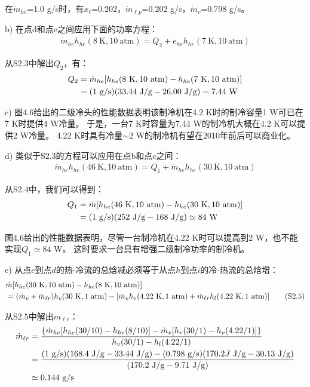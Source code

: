 在$\dot{m}_{he}$=1.0 g/s时，有$x_\ell$=0.202，$\dot{m}_{\ell p}$=0.202 g/s，$\dot{m}_{v}$=0.798 g/s。

b) 在点d和点e之间应用下面的功率方程：
\begin{align*}%
\dot{m}_{he}h_{he}(8\ \mathrm{K},10\ \mathrm{atm})=Q_2+\dot{e}_{he}h_{he}(7\ \mathrm{K},10\ \mathrm{atm}) \tag{S2.3}
\end{align*}

从S2.3中解出$Q_2$，有：
\begin{align*}%
Q_2&=\dot{m}_{he}[h_{he}(8\ \mathrm{K},10\ \mathrm{atm})-h_{he}(7\ \mathrm{K},10\ \mathrm{atm})]\\\notag
&=(1\ \mathrm{g/s})(33.44\ \mathrm{J/g}-26.00\ \mathrm{J/g})=7.44\ \mathrm{W}
\end{align*}

c) 图4.6给出的二级冷头的性能数据表明该制冷机在4.2 K时的制冷容量1 W可已在7 K时提供4 W冷量。
于是，一台7 K时容量为7.44 W的制冷机大概在4.2 K可以提供2 W冷量。
4.22 K时具有冷量$\sim 2$ W的制冷机有望在2010年前后可以商业化。

d) 类似于S2.3的方程可以应用在点b和点c之间：
\begin{align*}%
\dot{m}_{he}h_{he}(46\ \mathrm{K},10\ \mathrm{atm})=Q_1+\dot{m}_{he}h_{he}(30\ \mathrm{K},10\ \mathrm{atm}) \tag{S2.4}
\end{align*}

从S2.4中，我们可以得到：
\begin{align*}%
Q_1&=\dot{m}[h_{he}(46\ \mathrm{K},10\ \mathrm{atm})-h_{he}(30\ \mathrm{K},10\ \mathrm{atm})]\\\notag
&=(1\ \mathrm{g/s})(252\ \mathrm{J/g}-168\ \mathrm{J/g})\simeq 84\ \mathrm{W}
\end{align*}

图4.6给出的性能数据表明，尽管一台制冷机在4.22 K时可以提高到2 W，也不能实现$Q_1\simeq 84$ W。
这时要求一台具有增强二级制冷功率的制冷机。

e) 从点$c$到点$d$的热-冷流的总焓减必须等于从点$h$到点$i$的冷-热流的总焓增：
\begin{align*}%
&\dot{m}[h_{he}(30\ \mathrm{K},10\ \mathrm{atm})-h_{he}(8\ \mathrm{K},10\ \mathrm{atm})]\\\notag
&=(\dot{m}_v+\dot{m}_{\ell r})h_v(30\ \mathrm{K},1\ \mathrm{atm})-[\dot{m}_vh_v(4.22\ \mathrm{K},1\ \mathrm{atm})+\dot{m}_{\ell r}h_l(4.22\ \mathrm{K},1\ \mathrm{atm})] \tag{S2.5}
\end{align*}

从S2.5中解出$\dot{m}_{\ell r}$：
\begin{align*}%
\dot{m}_{\ell r}&=\frac{\{\dot{m}_{he}[h_{he}(30/10)-h_{he}(8/10)]-\dot{m}_v[h_v(30/1)-h_{v}(4.22/1)]\}}{h_v(30/1)-h_{l}(4.22/1)}\\\notag
&=\frac{(1\ \mathrm{g/s})(168.4\ \mathrm{J/g}-33.44\ \mathrm{J/g})-(0.798 \ \mathrm{g/s})(170.2J\ \mathrm{J/g}-30.13\ \mathrm{J/g})}{(170.2\ \mathrm{J/g}-9.71\ \mathrm{J/g})}\\\notag
&\simeq 0.144 \ \mathrm{g/s}
\end{align*}

